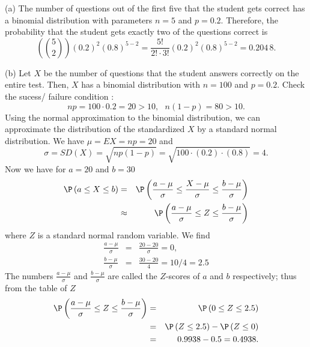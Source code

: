 \begin{Answer}

(a) The number of questions out of the first five that the student gets
correct has a binomial distribution with parameters $n=5$ and $p=0.2.$
Therefore, the probability that the student gets exactly two of the
questions correct is 
\begin{equation*}
\left( \binom{5}{2}\right) \left( 0.2\right) ^{2}\left( 0.8\right) ^{5-2}=%
\frac{5!}{2!\cdot 3!}\left( 0.2\right) ^{2}\left( 0.8\right) ^{5-2}=0.204\,8.
\end{equation*}

(b) Let $X$ be the number of questions that the student answers correctly on
the entire test. Then, $X$ has a binomial distribution with $n=100$ and $%
p=0.2$. Check the sucess/ failure condition :%
\begin{equation*}
np=100\cdot 0.2=20>10,\text{ }n(1-p)=80>10.
\end{equation*}%
Using the normal approximation to the binomial distribution, we can
approximate the distribution of the standardized $X$ by a standard normal
distribution. We have $\mu =EX=np=20$ and 
\begin{equation*}
\sigma =SD(X)=\sqrt{np(1-p)}=\sqrt{100\cdot \left( 0.2\right) \cdot \left(
0.8\right) }=4.
\end{equation*}%
Now we have for $a=20$ and $b=30$ 
\begin{eqnarray*}
\P \left( a\leq X\leq b\right) &=&\P \left( \frac{a-\mu }{\sigma }\leq 
\frac{X-\mu }{\sigma }\leq \frac{b-\mu }{\sigma }\right) \\
&\approx &\P \left( \frac{a-\mu }{\sigma }\leq Z\leq \frac{b-\mu }{\sigma }%
\right)
\end{eqnarray*}%
where $Z$ is a standard normal random variable. We find 
\begin{eqnarray*}
\frac{a-\mu }{\sigma } &=&\frac{20-20}{\sigma }=0, \\
\frac{b-\mu }{\sigma } &=&\frac{30-20}{4}=10/4=2.5
\end{eqnarray*}%
The numbers $\frac{a-\mu }{\sigma }$ and $\frac{b-\mu }{\sigma }$ are called
the $Z$-scores of $a$ and $b$ respectively; thus from the table of $Z$ 
\begin{eqnarray*}
\P \left( \frac{a-\mu }{\sigma }\leq Z\leq \frac{b-\mu }{\sigma }\right)
&=&\P \left( 0\leq Z\leq 2.5\right) \\
&=&\P \left( Z\leq 2.5\right) -\P \left( Z\leq 0\right) \\
&=&0.9938-0.5=0.4938.
\end{eqnarray*}
\end{Answer}

